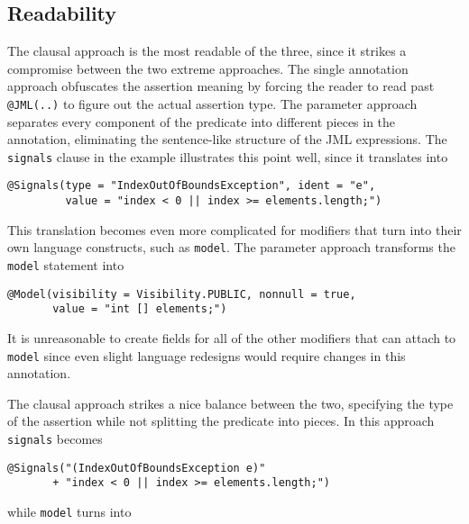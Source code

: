 \documentclass{llncs}
\begin{document}
\subsection{Readability}

The clausal approach is the most readable of the three, since it strikes a compromise between the two extreme approaches.  The single annotation approach obfuscates the assertion meaning by forcing the reader to read past \lstinline[language={[JML5]Java}]{@JML(..)} to figure out the actual assertion type.  The parameter approach separates every component of the predicate into different pieces in the annotation, eliminating the sentence-like structure of the JML expressions.  The \lstinline[language={[JML5]Java}]{signals} clause in the example illustrates this point well, since it translates into

\begin{lstlisting}[language={[JML5]Java}]
@Signals(type = "IndexOutOfBoundsException", ident = "e", 
         value = "index < 0 || index >= elements.length;")
\end{lstlisting}

This translation becomes even more complicated for modifiers that turn into their own language constructs, such as \lstinline[language={[JML5]Java}]{model}.  The parameter approach transforms the \lstinline[language={[JML5]Java}]{model} statement into

\begin{lstlisting}[language={[JML5]Java}]
@Model(visibility = Visibility.PUBLIC, nonnull = true, 
       value = "int [] elements;")
\end{lstlisting}

\noindent It is unreasonable to create fields for all of the other modifiers that can attach to \lstinline[language={[JML5]Java}]{model} since even slight language redesigns would require changes in this annotation.

The clausal approach strikes a nice balance between the two, specifying the type of the assertion while not splitting the predicate into pieces.  In this approach \lstinline[language={[JML5]Java}]{signals} becomes

\begin{lstlisting}[language={[JML5]Java}]
@Signals("(IndexOutOfBoundsException e)"
       + "index < 0 || index >= elements.length;")
\end{lstlisting}

\noindent while \lstinline[language={[JML5]Java}]{model} turns into
\end{document}
